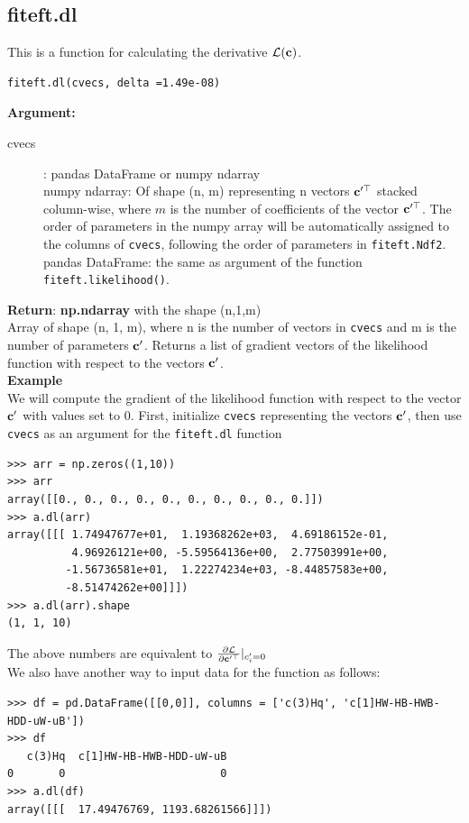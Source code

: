 \documentclass[12pt]{article}
\def\b#1{\boldsymbol{\rm #1}}
\begin{document}
\subsection{fiteft.dl}
This is a function for calculating the derivative $\mathcal{L}(\b c)$.
\begin{verbatim}
fiteft.dl(cvecs, delta =1.49e-08)
\end{verbatim}
\textbf{Argument:}
\begin{description}
  \item[cvecs]: pandas DataFrame or numpy ndarray\\
  numpy ndarray: Of shape (n, m) representing n vectors $\b c'^\top$ stacked column-wise, where $m$ is the number of coefficients of the vector $\b c'^\top$. The order of parameters in the numpy array will be automatically assigned to the columns of \verb|cvecs|, following the order of parameters in  \verb|fiteft.Ndf2|.\\
  pandas DataFrame: the same as argument of the function \verb|fiteft.likelihood()|.
 \end{description}
 \textbf{Return}: \textbf{np.ndarray} with the shape (n,1,m)\\
 \indent Array of shape (n, 1, m), where n is the number of vectors in \verb|cvecs| and m is the number of parameters $\b c'$. Returns a list of gradient vectors of the likelihood function with respect to the vectors $\b c'$.
 \\[1cm]
 \textbf{Example}\\
 We will compute the gradient of the likelihood function with respect to the vector $\b c'$ with values set to 0. First, initialize \verb|cvecs| representing the vectors $\b c'$, then use \verb|cvecs| as an argument for the \verb|fiteft.dl| function
\begin{verbatim}
>>> arr = np.zeros((1,10))
>>> arr
array([[0., 0., 0., 0., 0., 0., 0., 0., 0., 0.]])
>>> a.dl(arr)
array([[[ 1.74947677e+01,  1.19368262e+03,  4.69186152e-01,
          4.96926121e+00, -5.59564136e+00,  2.77503991e+00,
         -1.56736581e+01,  1.22274234e+03, -8.44857583e+00,
         -8.51474262e+00]]])
>>> a.dl(arr).shape
(1, 1, 10)
\end{verbatim}
The above numbers are equivalent to $\frac{\partial \mathcal{L}}{\partial \b c'^\top}|_{c'_i=0} $\\
We also have another way to input data for the function as follows:
\begin{verbatim}
>>> df = pd.DataFrame([[0,0]], columns = ['c(3)Hq', 'c[1]HW-HB-HWB-HDD-uW-uB'])
>>> df
   c(3)Hq  c[1]HW-HB-HWB-HDD-uW-uB
0       0                        0
>>> a.dl(df)
array([[[  17.49476769, 1193.68261566]]])
\end{verbatim}
\end{document}
